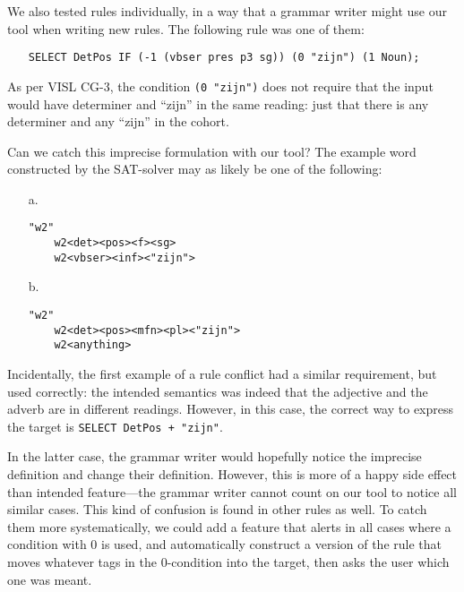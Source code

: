 We also tested rules individually, in a way that a grammar writer might use our tool when writing new rules.
The following rule was one of them:

\begin{itemize}
\item[] 
\texttt{SELECT DetPos IF (-1 (vbser pres p3 sg)) (0 "zijn") (1 Noun);}
\end{itemize} 

As per VISL CG-3, the condition \texttt{(0 "zijn")} does not require that the input would have determiner and ``zijn'' in the same reading: just that there is any determiner and any ``zijn'' in the cohort. 


Can we catch this imprecise formulation with our tool? The example word constructed by the SAT-solver may as likely be one of the following:

\begin{itemize}
\item[a.] \begin{verbatim}
"w2"
    w2<det><pos><f><sg>
    w2<vbser><inf><"zijn">
\end{verbatim}

\item[b.] \begin{verbatim}
"w2"
    w2<det><pos><mfn><pl><"zijn">
    w2<anything>
\end{verbatim}
\end{itemize}

Incidentally, the first example of a rule conflict had a similar requirement, but used correctly: the intended semantics was indeed that the adjective and the adverb are in different readings. However, in this case, the correct way to express the target is \texttt{SELECT DetPos + "zijn"}.

In the latter case, the grammar writer would hopefully notice the imprecise definition and change their definition. However, this is more of a happy side effect than intended feature---the grammar writer cannot count on our tool to notice all similar cases.
This kind of confusion is found in other rules as well. 
To catch them more systematically, we could add a feature that alerts in all cases where a condition with 0 is used, and automatically construct a version of the rule that moves whatever tags in the 0-condition into the target, then asks the user which one was meant.

